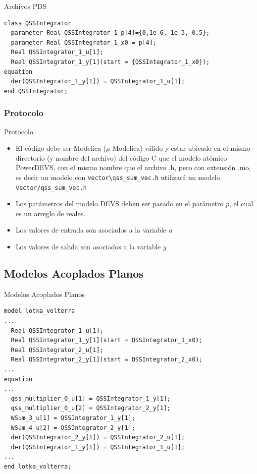 \documentclass[10pt,presentation]{beamer}
\begin{document}
\begin{frame}[fragile]{Archivos PDS}
\centering
\begin{verbatim}
class QSSIntegrator
  parameter Real QSSIntegrator_1_p[4]={0,1e-6, 1e-3, 0.5};
  parameter Real QSSIntegrator_1_x0 = p[4];
  Real QSSIntegrator_1_u[1];
  Real QSSIntegrator_1_y[1](start = {QSSIntegrator_1_x0});
equation
  der(QSSIntegrator_1_y[1]) = QSSIntegrator_1_u[1];
end QSSIntegrator;
\end{verbatim}
\end{frame}

		\subsubsection{Protocolo}
\begin{frame}[fragile]{Protocolo}
\begin{itemize}
        \item<1-> El código debe ser Modelica ($\mu$-Modelica) válido y estar ubicado en el mismo directorio (y nombre del archivo) del código C que el modelo atómico 
        PowerDEVS, con el mismo nombre que el archivo .h, pero con extensión .mo, es decir un modelo con \texttt{vector\textbackslash qss\_sum\_vec.h} 
	utilizará un modelo \texttt{vector/qss\_sum\_vec.h} 
        \item<2-> Los parámetros del modelo DEVS deben ser pasado en el parámetro $p$, el cual es un arreglo de reales. 
        \item<3-> Los valores de entrada son asociados a la variable $u$
        \item<4-> Los valores de salida son asociados a la variable $y$
\end{itemize}
\end{frame}

	\subsection{Modelos Acoplados Planos}

\begin{frame}[fragile]{Modelos Acoplados Planos}
\begin{verbatim}
model lotka_volterra
...
  Real QSSIntegrator_1_u[1];
  Real QSSIntegrator_1_y[1](start = QSSIntegrator_1_x0);
  Real QSSIntegrator_2_u[1];
  Real QSSIntegrator_2_y[1](start = QSSIntegrator_2_x0);
...
equation
...
  qss_multiplier_0_u[1] = QSSIntegrator_1_y[1];
  qss_multiplier_0_u[2] = QSSIntegrator_2_y[1];
  WSum_3_u[1] = QSSIntegrator_1_y[1];
  WSum_4_u[2] = QSSIntegrator_2_y[1];
  der(QSSIntegrator_2_y[1]) = QSSIntegrator_2_u[1];
  der(QSSIntegrator_1_y[1]) = QSSIntegrator_1_u[1];
...
end lotka_volterra;
\end{verbatim}
\end{frame}
\end{document}
